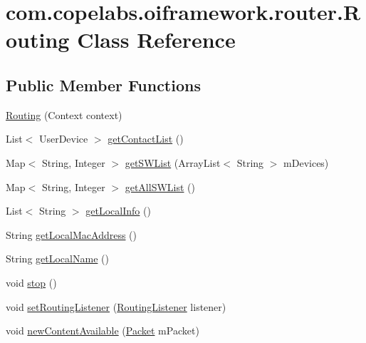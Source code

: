 \hypertarget{classcom_1_1copelabs_1_1oiframework_1_1router_1_1_routing}{}\section{com.\+copelabs.\+oiframework.\+router.\+Routing Class Reference}
\label{classcom_1_1copelabs_1_1oiframework_1_1router_1_1_routing}
\subsection*{Public Member Functions}
\begin{DoxyCompactItemize}
\item 
\hyperlink{classcom_1_1copelabs_1_1oiframework_1_1router_1_1_routing_ae0f95c53f3cbd90db0dabba7dcc7cced}{Routing} (Context context)
\item 
List$<$ User\+Device $>$ \hyperlink{classcom_1_1copelabs_1_1oiframework_1_1router_1_1_routing_a477c2e1f830054864334dc96d08dc5e7}{get\+Contact\+List} ()
\item 
Map$<$ String, Integer $>$ \hyperlink{classcom_1_1copelabs_1_1oiframework_1_1router_1_1_routing_a9cb0fb0ced4521962b9c44bcb94d61bb}{get\+S\+W\+List} (Array\+List$<$ String $>$ m\+Devices)
\item 
Map$<$ String, Integer $>$ \hyperlink{classcom_1_1copelabs_1_1oiframework_1_1router_1_1_routing_affc739caaa3e1da2414ce75cd9af2433}{get\+All\+S\+W\+List} ()
\item 
List$<$ String $>$ \hyperlink{classcom_1_1copelabs_1_1oiframework_1_1router_1_1_routing_a9a667c08f302af1b2d3b8a934739505d}{get\+Local\+Info} ()
\item 
String \hyperlink{classcom_1_1copelabs_1_1oiframework_1_1router_1_1_routing_abb25bf0444ba72c9963a04cc7390fd7e}{get\+Local\+Mac\+Address} ()
\item 
String \hyperlink{classcom_1_1copelabs_1_1oiframework_1_1router_1_1_routing_ac2b1e57ed2b2a47b4cd44a80ddcf3ef7}{get\+Local\+Name} ()
\item 
void \hyperlink{classcom_1_1copelabs_1_1oiframework_1_1router_1_1_routing_ac888bfc58783ff88e2d59266c83d626e}{stop} ()
\item 
void \hyperlink{classcom_1_1copelabs_1_1oiframework_1_1router_1_1_routing_a226edc7be42ceb42c6a010685cdc7034}{set\+Routing\+Listener} (\hyperlink{interfacecom_1_1copelabs_1_1oiframework_1_1router_1_1_routing_listener}{Routing\+Listener} listener)
\item 
void \hyperlink{classcom_1_1copelabs_1_1oiframework_1_1router_1_1_routing_a0a869c067165f75ab986aea8f3befee6}{new\+Content\+Available} (\hyperlink{classcom_1_1copelabs_1_1oiframework_1_1contentmanager_1_1_packet}{Packet} m\+Packet)
\end{DoxyCompactItemize}
